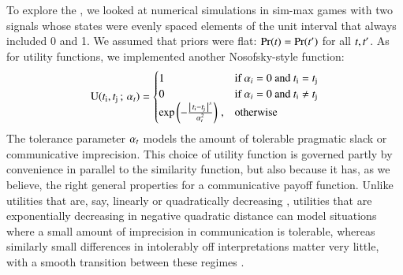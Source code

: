 To explore the \rdd, we looked at numerical simulations in sim-max
games with two signals whose states were evenly spaced elements of the
unit interval that always included 0 and 1. We assumed that priors
were flat: $\Pr(t) = \Pr(t')$ for all $t, t'$. As
for utility functions, we implemented another Nosofsky-style function:
\begin{align}
  \label{eq:NosofskyUtil}
  \mathrm{U}(t_{\mathrm{i}}, t_{\mathrm{j}} \thinspace ; \thinspace \alpha_t) =
      \begin{cases}
    1 & \textrm{if } \alpha_i = 0 \textrm{ and } t_{\mathrm{i}} = t_{\mathrm{j}} \\
    0 & \textrm{if } \alpha_i = 0 \textrm{ and } t_{\mathrm{i}} \neq t_{\mathrm{j}} \\
 \operatorname{exp} \left ( -  \frac{\left \lvert \, t_{\mathrm{i}} - t_{\mathrm{j}} \, \right\rvert^s}{ \alpha_t^2} \right ) \,,& \textrm{otherwise} \\
    \end{cases}
\end{align}
The tolerance parameter $\alpha_t$ models the amount of tolerable
pragmatic slack or communicative imprecision. This choice of utility
function is governed partly by convenience in parallel to the
similarity function, but also because it has, as we believe, the right
general properties for a communicative payoff function. Unlike
utilities that are, say, linearly or quadratically decreasing
\citep[as used
by][]{JagerMetzger2011:Voronoi-Languag,FrankeJager2010:Vagueness-Signa},
utilities that are exponentially decreasing in negative quadratic
distance can model situations where a small amount of imprecision in
communication is tolerable, whereas similarly small differences in
intolerably off interpretations matter very little, with a smooth
transition between these regimes \citep{OConnor2013:The-Evolution-o}.

